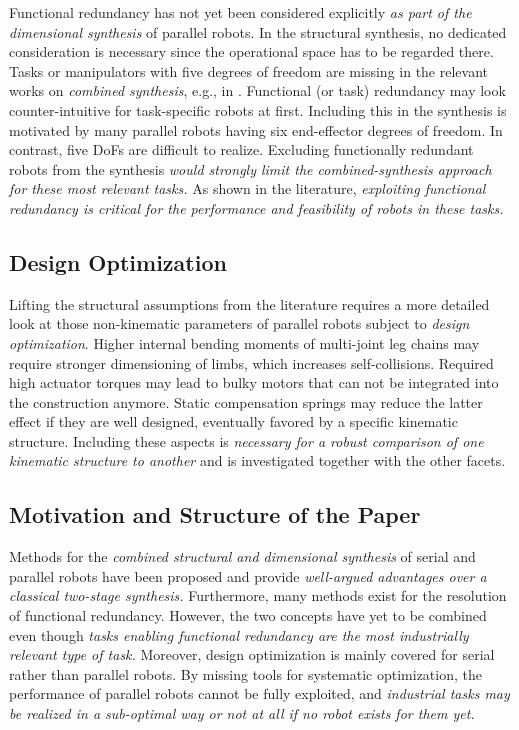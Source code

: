 Functional redundancy has not yet been considered explicitly \emph{as part of the dimensional synthesis} of parallel robots.
In the structural synthesis, no dedicated consideration is necessary since the operational space has to be regarded there. 
Tasks or manipulators with five degrees of freedom are missing in the relevant works on \emph{combined synthesis}, e.g., in \cite{Krefft2006,Prause2016,Ramirez2018}. 
%
%
Functional (or task) redundancy may look counter-intuitive for task-specific robots at first.
Including this in the synthesis is motivated by many parallel robots having six end-effector degrees of freedom. 
In contrast, five DoFs are difficult to realize. %
Excluding functionally redundant robots from the synthesis \emph{would strongly limit the combined-synthesis approach for these most relevant tasks.}
As shown in the literature, \emph{exploiting functional redundancy is critical for the performance and feasibility of robots in these tasks.}

%
%
%
%
%
%
%
%
%
%

\subsection{Design Optimization}
\label{sec:previouswork_desopt}
%

%
Lifting the structural assumptions from the literature requires a more detailed look at those non-kinematic parameters of parallel robots subject to \emph{design optimization}.
Higher internal bending moments of multi-joint leg chains may require stronger dimensioning of limbs, which increases self-collisions. 
Required high actuator torques may lead to bulky motors that can not be integrated into the construction anymore. 
Static compensation springs may reduce the latter effect if they are well designed, eventually favored by a specific kinematic structure.
Including these aspects is \emph{necessary for a robust comparison of one kinematic structure to another} and is investigated together with the other facets.

%
\subsection{Motivation and Structure of the Paper}
\label{sec:previouswork_summmary}
%

%
%
%

Methods for the \emph{combined structural and dimensional synthesis} of serial and parallel robots have been proposed and provide \emph{well-argued advantages over a classical two-stage synthesis.}
Furthermore, many methods exist for the resolution of functional redundancy.
%
%
%
However, the two concepts have yet to be combined even though \emph{tasks enabling functional redundancy are the most industrially relevant type of task.}
Moreover, design optimization is mainly covered for serial rather than parallel robots.
%
%
%
%
%
%
%
%
%
%
By missing tools for systematic optimization, the performance of parallel robots cannot be fully exploited, and \emph{industrial tasks may be realized in a sub-optimal way or not at all if no robot exists for them yet.}

